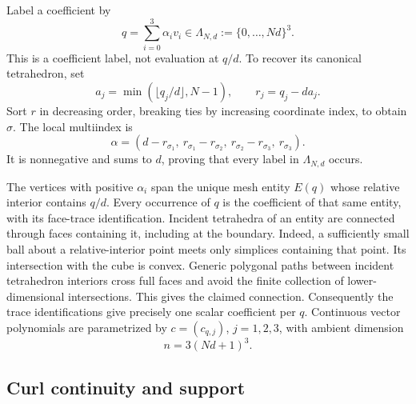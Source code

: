 \documentclass[11pt]{article}
\theoremstyle{remark}
\begin{document}
Label a coefficient by
\begin{equation}\label{eq:q}
 q=\sum_{i=0}^3\alpha_i v_i\in\Lambda_{N,d}:=\{0,\ldots,Nd\}^3.
\end{equation}
This is a coefficient label, not evaluation at $q/d$. To recover its
canonical tetrahedron, set
\begin{equation}\label{eq:canonical}
 a_j=\min(\lfloor q_j/d\rfloor,N-1),\qquad r_j=q_j-da_j.
\end{equation}
Sort $r$ in decreasing order, breaking ties by increasing coordinate index,
to obtain $\sigma$. The local multiindex is
\begin{equation}\label{eq:gaps}
 \alpha=(d-r_{\sigma_1},\ r_{\sigma_1}-r_{\sigma_2},\
                r_{\sigma_2}-r_{\sigma_3},\ r_{\sigma_3}).
\end{equation}
It is nonnegative and sums to $d$, proving that every label in
$\Lambda_{N,d}$ occurs.

The vertices with positive $\alpha_i$ span the unique mesh entity $E(q)$
whose relative interior contains $q/d$. Every occurrence of $q$ is the
coefficient of that same entity, with its face-trace identification.
Incident tetrahedra of an entity are connected through faces containing
it, including at the boundary. Indeed, a sufficiently small ball about a
relative-interior point meets only simplices containing that point.
Its intersection with the cube is convex. Generic polygonal paths between
incident tetrahedron interiors cross full faces and avoid the finite
collection of lower-dimensional intersections. This gives the claimed
connection. Consequently the trace identifications give precisely one
scalar coefficient per $q$. Continuous vector polynomials are parametrized
by $c=(c_{q,j})$, $j=1,2,3$, with ambient dimension
\begin{equation}\label{eq:ambient}
 n=3(Nd+1)^3.
\end{equation}

\subsection{Curl continuity and support}
\end{document}
